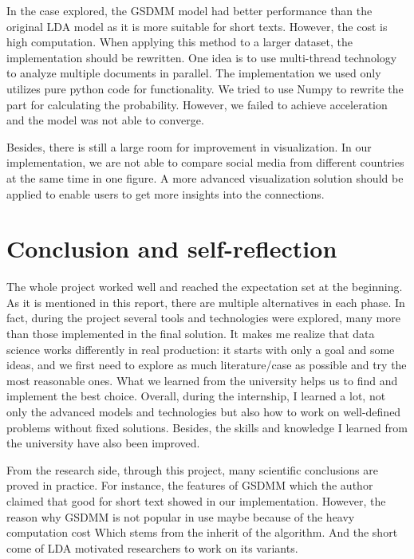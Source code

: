 \documentclass[sigchi]{acmart}
\begin{document}
In the case explored, the GSDMM model had better performance than the original LDA model as it is more suitable for short texts. However, the cost is high computation. When applying this method to a larger dataset, the implementation should be rewritten. One idea is to use multi-thread technology to analyze multiple documents in parallel. The implementation we used only utilizes pure python code for functionality. We tried to use Numpy to rewrite the part for calculating the probability. However, we failed to achieve acceleration and the model was not able to converge.

Besides, there is still a large room for improvement in visualization. In our implementation, we are not able to compare social media from different countries at the same time in one figure. A more advanced visualization solution should be applied to enable users to get more insights into the connections. 

\section{Conclusion and self-reflection}
The whole project worked well and reached the expectation set at the beginning. As it is mentioned in this report, there are multiple alternatives in each phase. In fact, during the project several tools and technologies were explored, many more than those implemented in the final solution. It makes me realize that data science works differently in real production: it starts with only a goal and some ideas, and we first need to explore as much literature/case as possible and try the most reasonable ones. What we learned from the university helps us to find and implement the best choice. Overall, during the internship, I learned a lot, not only the advanced models and technologies but also how to work on well-defined problems without fixed solutions. Besides, the skills and knowledge I learned from the university have also been improved.

From the research side, through this project, many scientific conclusions are proved in practice. For instance, the features of GSDMM which the author claimed that good for short text showed in our implementation. However, the reason why GSDMM is not popular in use maybe because of the heavy computation cost Which stems from the inherit of the algorithm. And the short come of LDA motivated researchers to work on its variants.


\end{document}
